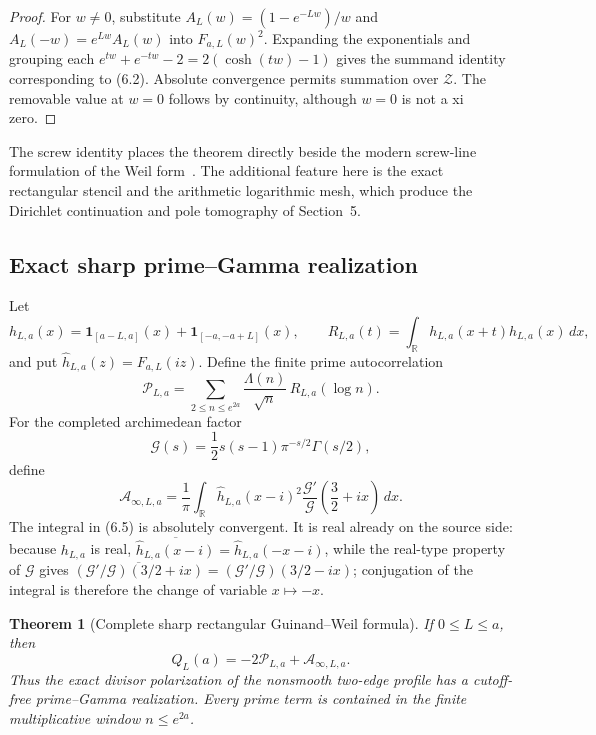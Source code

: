 \documentclass[11pt]{article}
\newtheorem{theorem}{Theorem}[section]
\newcommand{\R}{\mathbb R}
\newcommand{\cZ}{\mathcal Z}
\begin{document}
\begin{proof}
For $w\ne0$, substitute $A_L(w)=(1-e^{-Lw})/w$ and
$A_L(-w)=e^{Lw}A_L(w)$ into $F_{a,L}(w)^2$.  Expanding the exponentials and grouping each
$e^{tw}+e^{-tw}-2=2(\cosh(tw)-1)$ gives the summand identity corresponding to (6.2).
Absolute convergence permits summation over $\cZ$.  The removable value at $w=0$ follows by
continuity, although $w=0$ is not a xi zero.
\end{proof}

The screw identity places the theorem directly beside the modern screw-line formulation of the
Weil form~\cite{Suzuki2023,Suzuki2025,Suzuki2026}.  The additional feature here is the exact
rectangular stencil and the arithmetic logarithmic mesh, which produce the Dirichlet continuation
and pole tomography of Section~5.

\subsection{Exact sharp prime--Gamma realization}

Let
\[
 h_{L,a}(x)=\mathbf 1_{[a-L,a]}(x)+\mathbf 1_{[-a,-a+L]}(x),
 \qquad
 R_{L,a}(t)=\int_{\R}h_{L,a}(x+t)h_{L,a}(x)\,dx,
 \tag{6.3}
\]
and put $\widehat h_{L,a}(z)=F_{a,L}(iz)$.  Define the finite prime autocorrelation
\[
 \mathcal P_{L,a}
 =\sum_{2\le n\le e^{2a}}
   \frac{\Lambda(n)}{\sqrt n}\,R_{L,a}(\log n).
 \tag{6.4}
\]
For the completed archimedean factor
\[
 \mathcal G(s)=\frac12s(s-1)\pi^{-s/2}\Gamma(s/2),
\]
define
\[
 \mathcal A_{\infty,L,a}
 =\frac1\pi\int_{\R}
   \widehat h_{L,a}(x-i)^2
   \frac{\mathcal G'}{\mathcal G}\!\left(\frac32+ix\right)\,dx.
 \tag{6.5}
\]
The integral in \textup{(6.5)} is absolutely convergent.
It is real already on the source side: because $h_{L,a}$ is real,
$\overline{\widehat h_{L,a}(x-i)}=\widehat h_{L,a}(-x-i)$, while the real-type property of
$\mathcal G$ gives
$\overline{(\mathcal G'/\mathcal G)(3/2+ix)}=(\mathcal G'/\mathcal G)(3/2-ix)$; conjugation of
the integral is therefore the change of variable $x\mapsto-x$.

\begin{theorem}[Complete sharp rectangular Guinand--Weil formula]
\label{thm:sharp-guinand-weil}
If $0\le L\le a$, then
\[
 \boxed{Q_L(a)=-2\mathcal P_{L,a}+\mathcal A_{\infty,L,a}.}
 \tag{6.6}
\]
Thus the exact divisor polarization of the nonsmooth two-edge profile has a cutoff-free
prime--Gamma realization.  Every prime term is contained in the finite multiplicative window
$n\le e^{2a}$.
\end{theorem}
\end{document}
